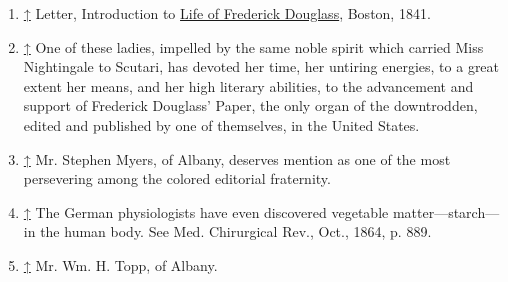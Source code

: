 \begin{enumerate}
\item
  \hypertarget{cite_note-1}{}

  {\protect\hyperlink{cite_ref-1}{↑}} {Letter, Introduction to
  \href{/wiki/Life_of_Frederick_Douglass}{Life of Frederick Douglass},
  Boston, 1841.}
\item
  \hypertarget{cite_note-2}{}

  {\protect\hyperlink{cite_ref-2}{↑}} {One of these ladies, impelled by
  the same noble spirit which carried Miss Nightingale to Scutari, has
  devoted her time, her untiring energies, to a great extent her means,
  and her high literary abilities, to the advancement and support of
  Frederick Douglass' Paper, the only organ of the downtrodden, edited
  and published by one of themselves, in the United States.}
\item
  \hypertarget{cite_note-3}{}

  {\protect\hyperlink{cite_ref-3}{↑}} {Mr. Stephen Myers, of Albany,
  deserves mention as one of the most persevering among the colored
  editorial fraternity.}
\item
  \hypertarget{cite_note-4}{}

  {\protect\hyperlink{cite_ref-4}{↑}} {The German physiologists have
  even discovered vegetable matter---starch---in the human body. See
  Med. Chirurgical Rev., Oct., 1864, p. 889.}
\item
  \hypertarget{cite_note-5}{}

  {\protect\hyperlink{cite_ref-5}{↑}} {Mr. Wm. H. Topp, of Albany.}
\end{enumerate}
